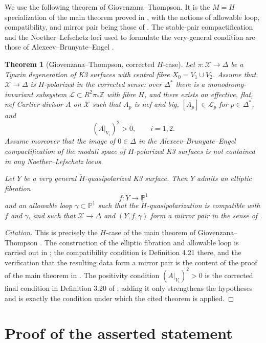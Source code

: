 \documentclass[11pt]{article}
\newtheorem{theorem}{Theorem}
\theoremstyle{remark}
\newcommand{\Z}{\mathbb Z}
\newcommand{\PP}{\mathbb P}
\newcommand{\cL}{\mathcal L}
\newcommand{\cX}{\mathcal X}
\begin{document}
We use the following theorem of Giovenzana--Thompson. It is the \(M=H\) specialization of the main theorem proved in \cite[\S 5]{dfk3slpms}, with the notions of allowable loop, compatibility, and mirror pair being those of \cite[Definitions 4.11, 4.21, and 5.1]{dfk3slpms}. The stable-pair compactification and the Noether--Lefschetz loci used to formulate the very-general condition are those of Alexeev--Brunyate--Engel \cite{cmek3sspt}.

\begin{theorem}[Giovenzana--Thompson, corrected \(H\)-case]\label{thm:GT}
Let \(\pi\colon \cX\to \Delta\) be a Tyurin degeneration of K3 surfaces with central fibre \(X_0=V_1\cup V_2\). Assume that \(\cX\to\Delta\) is \(H\)-polarized in the corrected sense: over \(\Delta^*\) there is a monodromy-invariant subsystem \(\cL\subset R^2\pi_*\Z\) with fibre \(H\), and there exists an effective, flat, nef Cartier divisor \(A\) on \(\cX\) such that \(A_p\) is nef and big, \([A_p]\in \cL_p\) for \(p\in \Delta^*\), and
\[
(A|_{V_i})^2>0,\qquad i=1,2.
\]
Assume moreover that the image of \(0\in \Delta\) in the Alexeev--Brunyate--Engel compactification of the moduli space of \(H\)-polarized K3 surfaces is not contained in any Noether--Lefschetz locus.

Let \(Y\) be a very general \(\check H\)-quasipolarized K3 surface. Then \(Y\) admits an elliptic fibration
\[
f\colon Y\to \PP^1
\]
and an allowable loop \(\gamma\subset \PP^1\) such that the \(\check H\)-quasipolarization is compatible with \(f\) and \(\gamma\), and such that \(\cX\to\Delta\) and \((Y,f,\gamma)\) form a mirror pair in the sense of \cite[Definition 5.1]{dfk3slpms}.
\end{theorem}

\begin{proof}[Citation]
This is precisely the \(H\)-case of the main theorem of Giovenzana--Thompson \cite[\S 5]{dfk3slpms}. The construction of the elliptic fibration and allowable loop is carried out in \cite[\S 4]{dfk3slpms}; the compatibility condition is Definition 4.21 there, and the verification that the resulting data form a mirror pair is the content of the proof of the main theorem in \cite[\S 5]{dfk3slpms}. The positivity condition \((A|_{V_i})^2>0\) is the corrected final condition in Definition 3.20 of \cite{dfk3slpms}; adding it only strengthens the hypotheses and is exactly the condition under which the cited theorem is applied.
\end{proof}

\section{Proof of the asserted statement}
\end{document}
